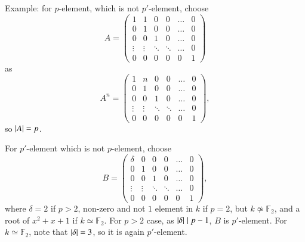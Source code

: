 \documentclass[a4paper, 12pt]{article}
\theoremstyle{Mydefinition}
\theoremstyle{Mytheorem}
\begin{document}
Example: for $p$-element, which is not $p'$-element, choose
\begin{equation}
    A = \begin{pmatrix}
    1 & 1 & 0 & 0 & \hdots & 0\\
    0 & 1 & 0 & 0 & \hdots &0\\
    0 & 0 & 1 & 0 & \hdots & 0\\
    \vdots & \vdots & \ddots & \ddots & \hdots & 0\\
    0 & 0 & 0 & 0 & 0 & 1
    \end{pmatrix}
\end{equation}
as
\begin{equation}
    A^n = \begin{pmatrix}
    1 & n & 0 & 0 & \hdots & 0\\
    0 & 1 & 0 & 0 & \hdots &0\\
    0 & 0 & 1 & 0 & \hdots & 0\\
    \vdots & \vdots & \ddots & \ddots & \hdots & 0\\
    0 & 0 & 0 & 0 & 0 & 1
    \end{pmatrix},
\end{equation}
so $\abs{A} = p$.

For $p'$-element which is not $p$-element, choose
\begin{equation}
    B = \begin{pmatrix}
    \delta & 0 & 0 & 0 & \hdots & 0\\
    0 & 1 & 0 & 0 & \hdots &0\\
    0 & 0 & 1 & 0 & \hdots & 0\\
    \vdots & \vdots & \ddots & \ddots & \hdots & 0\\
    0 & 0 & 0 & 0 & 0 & 1
    \end{pmatrix},
\end{equation}
where $\delta=2$ if $p>2$, non-zero and not $1$ element in $k$ if $p=2$, but $k\not\simeq \mathbb{F}_2$, and a root of $x^2+x+1$ if $k\simeq \mathbb{F}_2$. For $p>2$ case, as $\abs{\delta}\mid p-1$, $B$ is $p'$-element. For $k\simeq \mathbb{F}_2$, note that $\abs{\delta}=3$, so it is again $p'$-element.\\
\end{document}
